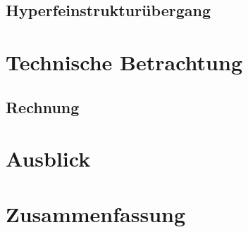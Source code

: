 \begin{refsection}
\subsection{Hyperfeinstrukturübergang}

\section{Technische Betrachtung}

\subsection{Rechnung}

\section{Ausblick} 

\section{Zusammenfassung}

\printbibliography[heading=subbibliography]
\end{refsection}

